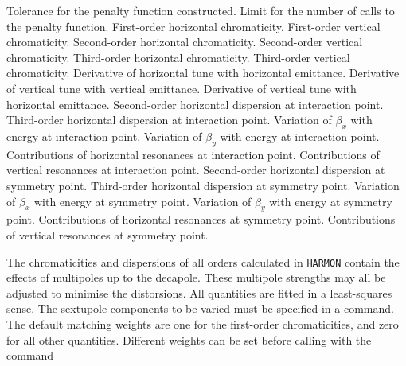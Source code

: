 \begin{mylist}
Tolerance for the penalty function constructed.
Limit for the number of calls to the penalty function.
First-order horizontal chromaticity.
First-order vertical chromaticity.
Second-order horizontal chromaticity.
Second-order vertical chromaticity.
Third-order horizontal chromaticity.
Third-order vertical chromaticity.
Derivative of horizontal tune with horizontal emittance.
Derivative of vertical tune with vertical emittance.
Derivative of vertical tune with horizontal emittance.
Second-order horizontal dispersion at interaction point.
Third-order horizontal dispersion at interaction point.
Variation of \(\beta_x\) with energy at interaction point.
Variation of \(\beta_y\) with energy at interaction point.
Contributions of horizontal resonances at interaction point.
Contributions of vertical resonances at interaction point.
Second-order horizontal dispersion at symmetry point.
Third-order horizontal dispersion at symmetry point.
Variation of \(\beta_x\) with energy at symmetry point.
Variation of \(\beta_y\) with energy at symmetry point.
Contributions of horizontal resonances at symmetry point.
Contributions of vertical resonances at symmetry point.
\end{mylist}
The chromaticities and dispersions of all orders calculated in {\tt HARMON}
contain the effects of multipoles up to the decapole.
These multipole strengths may all be adjusted to minimise the distorsions.
All quantities are fitted in a least-squares sense.
The sextupole components to be varied must be specified in a
 command.
The default matching weights are one for the first-order chromaticities,
and zero for all other quantities.
Different weights can be set before calling 
with the  command
 
